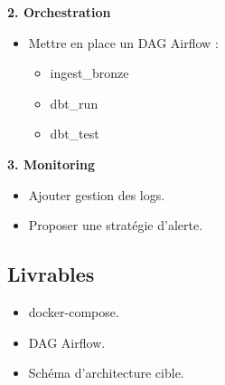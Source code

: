 \documentclass[11pt,a4paper]{article}
\begin{document}
\textbf{2. Orchestration}

\begin{itemize}
  \item Mettre en place un DAG Airflow :
  \begin{itemize}
    \item ingest\_bronze
    \item dbt\_run
    \item dbt\_test
  \end{itemize}
\end{itemize}

\textbf{3. Monitoring}

\begin{itemize}
  \item Ajouter gestion des logs.
  \item Proposer une stratégie d’alerte.
\end{itemize}

\subsection*{Livrables}

\begin{itemize}
  \item docker-compose.
  \item DAG Airflow.
  \item Schéma d’architecture cible.
\end{itemize}
\end{document}
